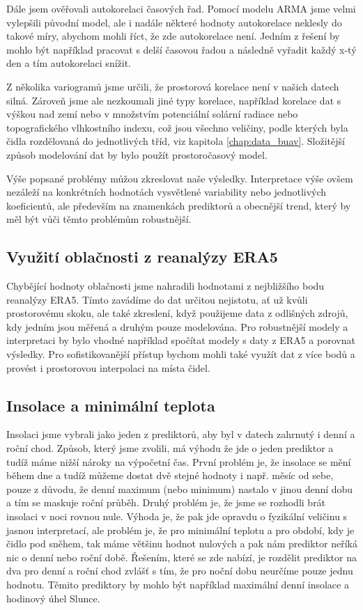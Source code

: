 Dále jsem ověřovali autokorelaci časových řad. Pomocí modelu ARMA jsme velmi vylepšili původní model, ale i nadále některé hodnoty autokorelace neklesly do takové míry, abychom mohli říct, že zde autokorelace není. Jedním z řešení by mohlo být například pracovat s delší časovou řadou a následně vyřadit každý x-tý den a tím autokorelaci snížit. 

Z několika variogramů jsme určili, že prostorová korelace není v našich datech silná. Zároveň jsme ale nezkoumali jiné typy korelace, například korelace dat s výškou nad zemí nebo v množstvím potenciální solární radiace nebo topografického vlhkostního indexu, což jsou všechno veličiny, podle kterých byla čidla rozdělovaná do jednotlivých tříd, viz kapitola \ref{chap:data_buav}. Složitější způsob modelování dat by bylo použít prostoročasový model.

Výše popsané problémy můžou zkreslovat naše výsledky. Interpretace výše ovšem nezáleží na konkrétních hodnotách vysvětlené variability nebo jednotlivých koeficientů, ale především na znamenkách prediktorů a obecnější trend, který by měl být vůči těmto problémům robustnější.

\subsection{Využití oblačnosti z reanalýzy ERA5}\label{chap:disc_era5}
Chybějící hodnoty oblačnosti jsme nahradili hodnotami z nejbližšího bodu reanalýzy ERA5. Tímto zavádíme do dat určitou nejistotu, ať už kvůli prostorovému skoku, ale také zkreslení, když použijeme data z odlišných zdrojů, kdy jedním jsou měřená a druhým pouze modelována. Pro robustnější modely a interpretaci by bylo vhodné například spočítat modely s daty z ERA5 a porovnat výsledky. Pro sofistikovanější přístup bychom mohli také využít dat z více bodů a provést i prostorovou interpolaci na místa čidel.

\subsection{Insolace a minimální teplota}\label{chap:mintemp_insolation}
Insolaci jsme vybrali jako jeden z prediktorů, aby byl v datech zahrnutý i denní a roční chod. Způsob, který jsme zvolili, má výhodu že jde o jeden prediktor a tudíž máme nižší nároky na výpočetní čas. První problém je, že insolace se mění během dne a tudíž můžeme dostat dvě stejné hodnoty i např. měsíc od sebe, pouze z důvodu, že denní maximum (nebo minimum) nastalo v jinou denní dobu a tím se maskuje roční průběh. Druhý problém je, že jsme se rozhodli brát insolaci v noci rovnou nule. Výhoda je, že pak jde opravdu o fyzikální veličinu s jasnou interpretací, ale problém je, že pro minimální teplotu a pro období, kdy je čidlo pod sněhem, tak máme většinu hodnot nulových a pak nám prediktor neříká nic o denní nebo roční době. Řešením, které se zde nabízí, je rozdělit prediktor na dva pro denní a roční chod zvlášť s tím, že pro noční dobu neurčíme pouze jednu hodnotu. Těmito prediktory by mohlo být například maximální denní insolace a hodinový úhel Slunce.
